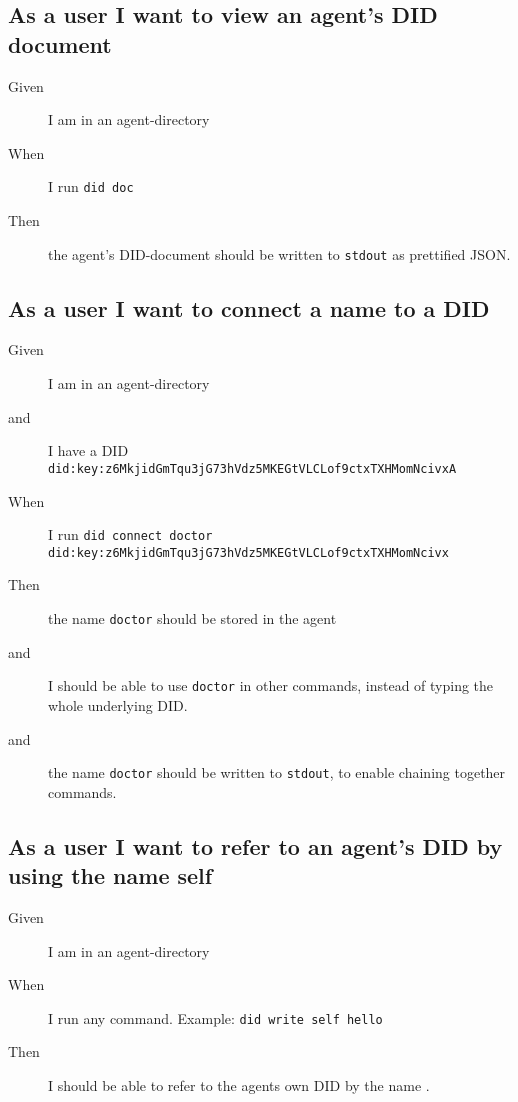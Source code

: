\subsection{As a user I want to view an agent's DID document}
\begin{description}\begin{description}
    \item[Given] I am in an agent-directory
    \item[When] I run \texttt{did doc}
    \item[Then] the agent's DID-document should be written to \texttt{stdout} as prettified JSON.
\end{description}\end{description}


\subsection{As a user I want to connect a name to a DID}
\begin{description}\begin{description}
    \item[Given] I am in an agent-directory
    \item[and] I have a DID \texttt{did:key:z6MkjidGmTqu3jG73hVdz5MKEGtVLCLof9ctxTXHMomNcivxA}
    \item[When] I run \texttt{did connect doctor did:key:z6MkjidGmTqu3jG73hVdz5MKEGtVLCLof9ctxTXHMomNcivx}
    \item[Then] the name \texttt{doctor} should be stored in the agent
    \item[and] I should be able to use \texttt{doctor} in other commands, instead of typing the whole underlying DID.
    \item[and] the name \texttt{doctor} should be written to \texttt{stdout}, to enable chaining together commands.
\end{description}\end{description}


\subsection{As a user I want to refer to an agent's DID by using the name self}
\begin{description}\begin{description}
    \item[Given] I am in an agent-directory
    \item[When] I run any command. Example: \texttt{did write self hello}
    \item[Then] I should be able to refer to the agents own DID by the name .
\end{description}\end{description}


